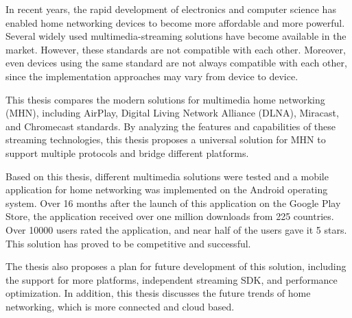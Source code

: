 In recent years, the rapid development of electronics and computer science has
enabled home networking devices to become more affordable and more powerful.
Several widely used multimedia-streaming solutions have become available in the
market. However, these standards are not compatible with each other. Moreover,
even devices using the same standard are not always compatible with each other,
since the implementation approaches may vary from device to device.

This thesis compares the modern solutions for multimedia home networking (MHN),
including AirPlay, Digital Living Network Alliance (DLNA), Miracast, and
Chromecast standards. By analyzing the features and capabilities of these
streaming technologies, this thesis proposes a universal solution for MHN to
support multiple protocols and bridge different platforms.

Based on this thesis, different multimedia solutions were tested and a mobile
application for home networking was implemented on the Android operating system.
Over 16 months after the launch of this application on the Google Play Store,
the application received over one million downloads from 225 countries.
Over 10000 users rated the application, and near half of the users gave it 5
stars. This solution has proved to be competitive and successful.

The thesis also proposes a plan for future development of this solution,
including the support for more platforms, independent streaming SDK, and
performance optimization. In addition, this thesis discusses the future trends
of home networking, which is more connected and cloud based.
